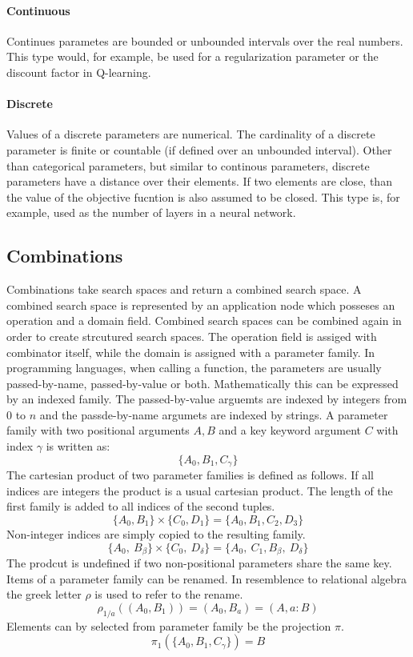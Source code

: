 \documentclass[english]{article}
\begin{document}
\paragraph{Continuous}
Continues parametes are bounded or unbounded intervals over the real numbers. This type would, for example, be used for a regularization parameter or the discount factor in Q-learning.

\paragraph{Discrete}
Values of a discrete parameters are numerical. The cardinality of a discrete parameter is finite or countable (if defined over an unbounded interval).
Other than categorical parameters, but similar to continous parameters, discrete parameters have a distance over their elements. If two elements are close, than the value of the objective fucntion is also assumed to be closed. This type is, for example, used as the number of layers in a neural network.

\subsection{Combinations}
Combinations take search spaces and return a combined search space. A combined search space is represented by an application node which posseses an operation and a domain field. Combined search spaces can be combined again in order to create strcutured search spaces. The operation field is assiged with combinator itself, while the domain is assigned with a parameter family.
In programming languages, when calling a function, the parameters are usually passed-by-name, passed-by-value or both. Mathematically this can be expressed by an indexed family. The passed-by-value arguemts are indexed by integers from $0$ to $n$ and the passde-by-name argumets are indexed by strings. A parameter family with two positional arguments $A,B$ and a key keyword argument $C$ with index $\gamma$ is written as:
$$\{A_0, B_1, C_\gamma\}$$
The cartesian product of two parameter families is defined as follows. If all indices are integers the product is a usual cartesian product. The length of the first family is added to all indices of the second tuples.
$$\{A_0, B_1\} \times \{C_0, D_1\} = \{A_0, B_1, C_2, D_3\}$$
Non-integer indices are simply copied to the resulting family.
$$\{A_0,\ B_\beta\} \times \{C_0,\ D_\delta\} = \{A_0,\ C_1, B_\beta,\ D_\delta\}$$
The prodcut is undefined if two non-positional parameters share the same key.
Items of a parameter family can be renamed. In resemblence to relational algebra the greek letter $\rho$ is used to refer to the rename.
$$\rho_{1/a}((A_{0}, B_{1})) = (A_{0}, B_{a}) = (A, a:B)$$
Elements can by selected from parameter family be the projection $\pi$.
$$\pi_1(\{A_0, B_1, C_\gamma\}) = B$$
\end{document}
